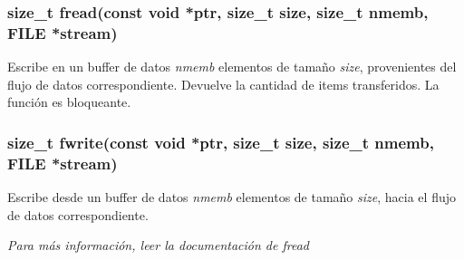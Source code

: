 \documentclass[oneside]{article}
\begin{document}
		\subsubsection {size\_t fread(const void *ptr, size\_t size, size\_t nmemb, FILE *stream)}
		Escribe en un buffer de datos \emph{nmemb} elementos de tamaño \emph{size}, provenientes del flujo de datos correspondiente. Devuelve la cantidad de items transferidos. La función es bloqueante.\\

		\subsubsection {size\_t fwrite(const void *ptr, size\_t size, size\_t nmemb, FILE *stream)}
		Escribe desde un buffer de datos \emph{nmemb} elementos de tamaño \emph{size}, hacia el flujo de datos correspondiente.

		\textit{Para más información, leer la documentación de fread}
\end{document}

